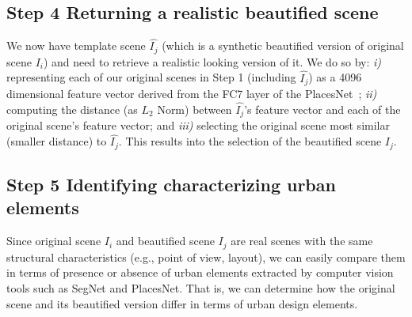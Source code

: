 \subsection*{Step 4 Returning a realistic beautified scene}
We now have template scene $\hat{I_j}$ (which is a synthetic beautified version of original scene $I_i$) and need to retrieve a realistic looking version of it. We do so by: \emph{i)} representing each of our original scenes in Step 1 (including $\hat{I_j}$) as a 4096 dimensional feature vector derived from the FC7 layer of the PlacesNet~\cite{zhou2014learning}; \emph{ii)} computing the distance (as $L_2$ Norm) between $\hat{I_j}$'s feature vector and each of the original scene's feature vector; and \emph{iii)} selecting the original scene most similar (smaller distance) to $\hat{I_j}$. This results into the selection of the beautified scene $I_j$.


\subsection*{Step 5 Identifying  characterizing urban elements}
Since original scene $I_i$ and beautified scene $I_j$ are real scenes with the  same structural characteristics (e.g., point of view, layout), we can easily compare them in terms of presence or absence of urban elements extracted by computer vision tools such as SegNet and PlacesNet. That is, we can determine how the original scene and its beautified version differ in terms of urban design elements. 




